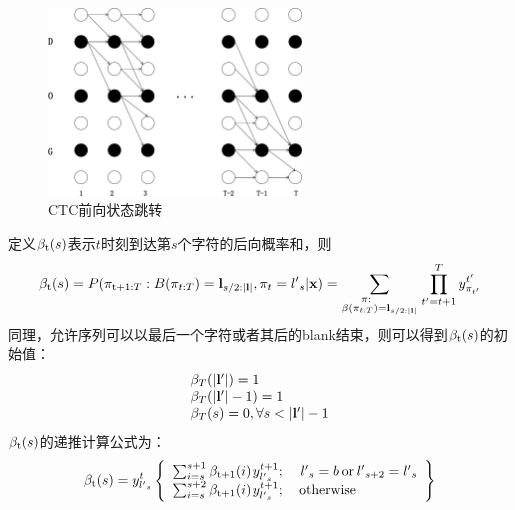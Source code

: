 \begin{figure}
\centering
\includegraphics[width=0.6\textwidth]{figures/chapter4/forback-crop}
\caption{CTC前向状态跳转}
\label{fig:ctcforback}
\end{figure}

定义${\beta _{\rm{t}}}(s)$表示$t$时刻到达第$s$个字符的后向概率和，则
\begin{equation}
{\beta _{\rm{t}}}(s) = P({\pi _{{\rm{t}} + 1:T}}:B({\pi _{t:T}}) = {{\bf{l}}_{s/2:{\rm{|}}{\bf{l}}|}},{\pi _t} = {{l'}_s}{\rm{|}}{\bf{x}}{\rm{) = }}\sum\limits_{\scriptstyle{\kern 1pt} {\kern 1pt} {\kern 1pt} {\kern 1pt} {\kern 1pt} {\kern 1pt} {\kern 1pt} {\kern 1pt} {\kern 1pt} {\kern 1pt} {\kern 1pt} {\kern 1pt} {\kern 1pt} {\kern 1pt} \pi :\hfill\atop
\scriptstyle\beta ({\pi _{t:T}}) = {{\bf{l}}_{s/2:{\rm{|}}{\bf{l}}|}}\hfill} {\prod\limits_{t' = t + 1}^T {y_{{\pi _{t'}}}^{t'}} }
\end{equation}
同理，允许序列可以以最后一个字符或者其后的blank结束，则可以得到${\beta _{\rm{t}}}(s)$的初始值：
\begin{equation}
\begin{array}{l}
{\beta _T}(|{\bf{l'}}|) = 1\\
{\beta _T}(|{\bf{l'}}| - 1) = 1\\
{\beta _T}(s) = 0,\forall s < |{\bf{l'}}| - 1
\end{array}
\end{equation}
${\beta _{\rm{t}}}(s)$的递推计算公式为：
\begin{equation}
\label{equation:beta}
{\beta _{\rm{t}}}(s) = y_{{{l'}_s}}^t\left\{ \begin{array}{l}
\sum\nolimits_{i = s}^{s + 1} {{\beta _{{\rm{t + 1}}}}(i){\kern 1pt} y_{{{l'}_s}}^{t + 1};} {\kern 1pt} {\kern 1pt} {\kern 1pt} {\kern 1pt} {\kern 1pt} {\kern 1pt} {\kern 1pt} {\kern 1pt} {\kern 1pt} {\kern 1pt} {\kern 1pt} {\kern 1pt} {\kern 1pt} {{l'}_s} = b{\kern 1pt} {\kern 1pt} {\rm{or}}{\kern 1pt} {\kern 1pt} {{l'}_{s + 2}} = {{l'}_s}\\
\sum\nolimits_{i = s}^{s + 2} {{\beta _{{\rm{t + 1}}}}(i){\kern 1pt} y_{{{l'}_s}}^{t + 1};} {\kern 1pt} {\kern 1pt} {\kern 1pt} {\kern 1pt} {\kern 1pt} {\kern 1pt} {\kern 1pt} {\kern 1pt} {\kern 1pt} {\kern 1pt} {\kern 1pt} {\kern 1pt} {\rm{otherwise}}
\end{array} \right\}
\end{equation}


